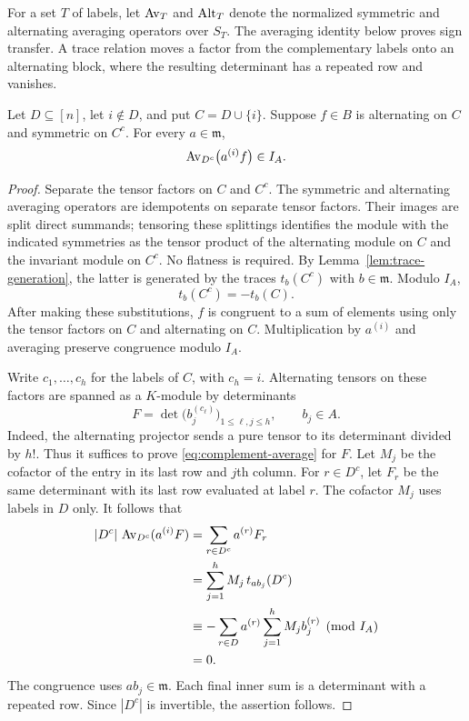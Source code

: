For a set $T$ of labels, let $\operatorname{Av}_T$ and $\operatorname{Alt}_T$ denote
the normalized symmetric and alternating averaging
operators over $S_T$.
The averaging identity below proves sign transfer. A trace relation
moves a factor from the complementary labels onto an
alternating block, where the resulting determinant has a repeated
row and vanishes.

\begin{lemma}\label{lem:complement-average}
Let $D\subseteq[n]$, let $i\notin D$, and put
$C=D\cup\{i\}$.  Suppose $f\in B$ is alternating on
$C$ and symmetric on $C^c$.
For every $a\in\mathfrak m$,
\begin{equation}\label{eq:complement-average}
 \operatorname{Av}_{D^c}\bigl(a^{(i)}f\bigr)\in I_A.
\end{equation}
\end{lemma}

\begin{proof}
Separate the tensor factors on $C$ and $C^c$.
The symmetric and alternating averaging operators are idempotents
on separate tensor factors.  Their images are split direct summands;
tensoring these splittings identifies the module with the indicated
symmetries as the tensor product of the alternating module on $C$
and the invariant module on $C^c$.  No flatness is required.
By Lemma~\ref{lem:trace-generation}, the latter is
generated by the traces $t_b(C^c)$ with $b\in\mathfrak m$.
Modulo $I_A$,
\[
 t_b(C^c)=-t_b(C).
\]
After making these substitutions, $f$ is congruent to
a sum of elements using only the tensor factors on
$C$ and alternating on $C$.  Multiplication by $a^{(i)}$
and averaging preserve congruence modulo $I_A$.

Write $c_1,\ldots,c_h$ for the labels of $C$, with
$c_h=i$.
Alternating tensors on these factors are spanned as a $K$-module by
determinants
\[
 F=\det\bigl(b_j^{(c_\ell)}\bigr)_{1\leq\ell,j\leq h},
        \qquad b_j\in A.
\]
Indeed, the alternating projector sends a pure tensor to its
determinant divided by $h!$.  Thus it suffices to prove \eqref{eq:complement-average}
for $F$.
Let $M_j$ be the cofactor of the entry in its last row
and $j$th column.  For $r\in D^c$, let $F_r$ be the
same determinant with its last row evaluated at label
$r$.  The cofactor $M_j$ uses labels in $D$ only.
It follows that
\begin{align*}
 |D^c|\,\operatorname{Av}_{D^c}(a^{(i)}F)
   &=\sum_{r\in D^c}a^{(r)}F_r\\
   &=\sum_{j=1}^h M_j\,t_{ab_j}(D^c)\\
   &\equiv-\sum_{r\in D}a^{(r)}
                     \sum_{j=1}^h M_j b_j^{(r)}
                          \pmod{I_A}\\
   &=0.
\end{align*}
The congruence uses $ab_j\in\mathfrak m$.
Each final inner sum is a determinant with a repeated
row.  Since $|D^c|$ is invertible, the assertion follows.
\end{proof}

